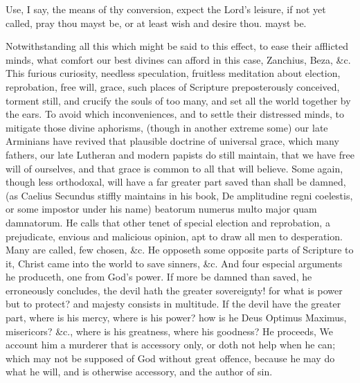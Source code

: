{Use, I say, the means of thy conversion, expect the Lord's leisure, if
not yet called, pray thou mayst be, or at least wish and desire thou.
mayst be.

Notwithstanding all this which might be said to this effect, to ease
their afflicted minds, what comfort our best divines can afford in this
case, Zanchius, Beza, \&c. This furious curiosity, needless speculation,
fruitless meditation about election, reprobation, free will, grace,
such places of Scripture preposterously conceived, torment still, and
crucify the souls of too many, and set all the world together by the
ears. To avoid which inconveniences, and to settle their distressed
minds, to mitigate those divine aphorisms, (though in another extreme
some) our late Arminians have revived that plausible doctrine of
universal grace, which many fathers, our late Lutheran and modern
papists do still maintain, that we have free will of ourselves, and
that grace is common to all that will believe. Some again, though less
orthodoxal, will have a far greater part saved than shall be damned,
(as Caelius Secundus stiffly maintains in his book, De
amplitudine regni coelestis, or some impostor under his name) beatorum
numerus multo major quam damnatorum. He calls that other tenet of
special election and reprobation, a prejudicate, envious and
malicious opinion, apt to draw all men to desperation. Many are called,
few chosen, \&c. He opposeth some opposite parts of Scripture to it,
Christ came into the world to save sinners, \&c. And four especial
arguments he produceth, one from God's power. If more be damned than
saved, he erroneously concludes, the devil hath the greater
sovereignty! for what is power but to protect? and majesty consists in
multitude. If the devil have the greater part, where is his mercy,
where is his power? how is he Deus Optimus Maximus, misericors? \&c.,
where is his greatness, where his goodness? He proceeds, We
account him a murderer that is accessory only, or doth not help when he
can; which may not be supposed of God without great offence, because he
may do what he will, and is otherwise accessory, and the author of sin.

}
